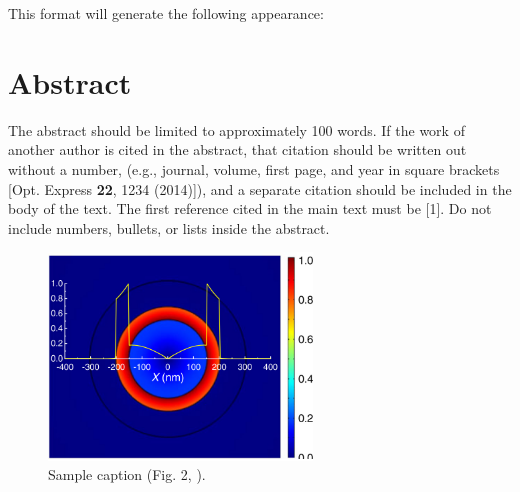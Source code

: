 \documentclass{optica-article}
\begin{document}
This format will generate the following appearance:

\medskip

\author{Author One and Author Two}

\address{Peer Review, Publications Department,
	Optica Publishing Group, 2010 Massachusetts Avenue NW, Washington, DC 20036, USA\\
	Publications Department, Optica Publishing Group, 2010
	Massachusetts Avenue NW, Washington, DC 20036, USA\\
	The authors contributed equally to this work.\\
	\authormark{*}opex@optica.org}
\medskip

\section{Abstract}
The abstract should be limited to approximately 100 words. If the work of
another author is cited in the abstract, that citation should be written out
without a number, (e.g., journal, volume, first page, and year in square brackets [Opt. Express {\bfseries 22}, 1234 (2014)]), and a separate citation should be included in the body of the text. The first reference cited in the main text must be [1]. Do not include numbers, bullets, or lists inside the abstract.

\begin{figure}[h!]
	\centering\includegraphics[width=7cm]{opticafig1}
	\caption{Sample caption (Fig. 2, \cite{Yelin:03}).}
\end{figure}
\end{document}
